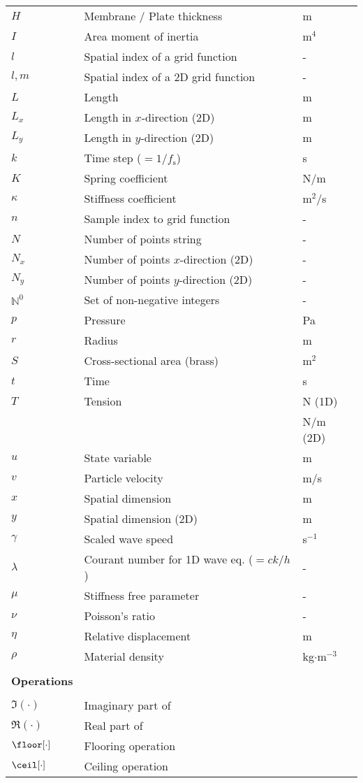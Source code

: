 {\begin{longtable}{ p{2cm} p{6.5cm} p{2.5cm}  }
 $H$ & Membrane / Plate thickness & m \\ 
 $I$ & Area moment of inertia & m$^4$\\
 $l$ & Spatial index of a grid function & - \\
 $l,m$ & Spatial index of a 2D grid function & - \\
 $L$ & Length & m\\
 $L_x$ & Length in $x$-direction (2D) & m\\
 $L_y$ & Length in $y$-direction (2D) & m\\
 $k$ & Time step ($=1/f_\text{s}$) & s\\
 $K$ & Spring coefficient & N/m\\
 $\kappa$ & Stiffness coefficient & m$^2$/s \\
 $n$ & Sample index to grid function & - \\
 $N$ & Number of points string & -\\
 $N_x$ & Number of points $x$-direction (2D) & -\\
 $N_y$ & Number of points $y$-direction (2D) & -\\
 $\mathbb{N}^0$ & Set of non-negative integers %
 & -\\
 $p$ & Pressure & Pa\\
 $r$ & Radius & m\\
 $S$ & Cross-sectional area (brass) & m$^2$\\
 $t$ & Time & s\\
 $T$ & Tension & N (1D)\\
 & & N/m (2D)\\
 $u$ & State variable & m\\ 
 $v$ & Particle velocity & m/s\\ 
 $x$ & Spatial dimension & m\\
 $y$ & Spatial dimension (2D) & m\\
 $\gamma$ & Scaled wave speed & s$^{-1}$\\
 $\lambda$ & Courant number for 1D wave eq. ($=ck/h$) & -\\
 $\mu$ & Stiffness free parameter & -\\
 $\nu$ & Poisson's ratio & -\\
 $\eta$ & Relative displacement & m\\
 $\rho$ & Material density & kg$\cdot$m$^{-3}$\\
 \\
    \hline {\bf Operations}\\\hline
 \\
 $\mathfrak{I}(\cdot)$ & Imaginary part of &\\
 $\mathfrak{R}(\cdot)$ & Real part of & \\
 $\floor[\cdot]$ & Flooring operation &\\
 $\ceil[\cdot]$ & Ceiling operation &%
\end{longtable}}